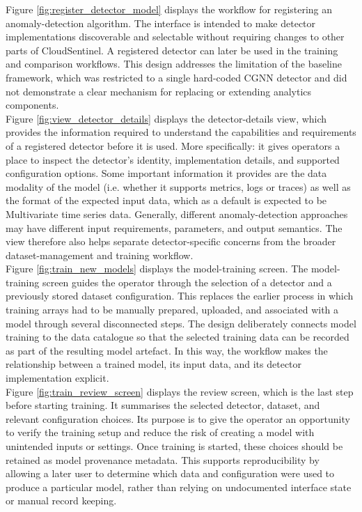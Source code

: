 Figure \ref{fig:register_detector_model} displays the workflow for registering an anomaly-detection algorithm. The interface is intended to make detector implementations discoverable and selectable without requiring changes to other parts of CloudSentinel. A registered detector can later be used in the training and comparison workflows. This design addresses the limitation of the baseline framework, which was restricted to a single hard-coded CGNN detector and did not demonstrate a clear mechanism for replacing or extending analytics components.\\

Figure \ref{fig:view_detector_details} displays the detector-details view, which provides the information required to understand the capabilities and requirements of a registered detector before it is used. More specifically: it gives operators a place to inspect the detector’s identity, implementation details, and supported configuration options. Some important information it provides are the data modality of the model (i.e. whether it supports metrics, logs or traces) as well as the  format of the expected input data, which as a default is expected to be Multivariate time series data. Generally, different anomaly-detection approaches may have different input requirements, parameters, and output semantics. The view therefore also helps separate detector-specific concerns from the broader dataset-management and training workflow.\\

Figure \ref{fig:train_new_models} displays the model-training screen. The model-training screen guides the operator through the selection of a detector and a previously stored dataset configuration. This replaces the earlier process in which training arrays had to be manually prepared, uploaded, and associated with a model through several disconnected steps. The design deliberately connects model training to the data catalogue so that the selected training data can be recorded as part of the resulting model artefact. In this way, the workflow makes the relationship between a trained model, its input data, and its detector implementation explicit.\\

Figure \ref{fig:train_review_screen} displays the review screen, which is the last step before starting training. It summarises the selected detector, dataset, and relevant configuration choices. Its purpose is to give the operator an opportunity to verify the training setup and reduce the risk of creating a model with unintended inputs or settings. Once training is started, these choices should be retained as model provenance metadata. This supports reproducibility by allowing a later user to determine which data and configuration were used to produce a particular model, rather than relying on undocumented interface state or manual record keeping.\\

